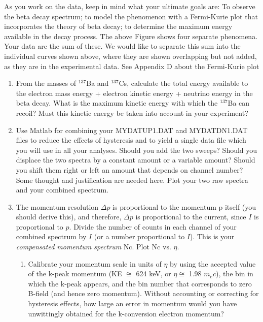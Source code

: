 \documentclass{../lab}
\begin{document}
As you work on the data, keep in mind what your ultimate goals are: To observe the beta decay spectrum; to model the phenomenon with a Fermi-Kurie plot that incorporates the theory of beta decay; to determine the maximum energy available in the decay process. The above Figure shows four separate phenomena. Your data are the sum of these. We would like to separate this sum into the individual curves shown above, where they are shown overlapping but not added, as they are in the experimental data. See Appendix D about the Fermi-Kurie plot

\begin{enumerate}
    \item From the masses of $^{137}$Ba and $^{137}$Cs, calculate the total energy available to the electron mass energy + electron kinetic energy + neutrino energy in the beta decay. What is the maximum kinetic energy with which the $^{137}$Ba can recoil? Must this kinetic energy be taken into account in your experiment?

    \item Use Matlab for combining your MYDATUP1.DAT and MYDATDN1.DAT files to reduce the effects of hysteresis and to yield a single data file which you will use in all your analyses. Should you add the two sweeps? Should you displace the two spectra by a constant amount or a variable amount? Should you shift them right or left an amount that depends on channel number? Some thought and justification are needed here. Plot your two raw spectra and your combined spectrum.

    \item The momentum resolution $\Delta p$ is proportional to the momentum p itself (you should derive this), and therefore, $\Delta p$ is proportional to the current, since $I$ is proportional to $p$. Divide the number of counts in each channel of your combined spectrum by $I$ (or a number proportional to $I$). This is your \emph{compensated momentum spectrum} Nc. Plot Nc vs. $\eta$.

    \begin{enumerate}
        \item Calibrate your momentum scale in units of $\eta$ by using the accepted value of the k-peak momentum (KE $\cong$ 624 keV, or $\eta \cong$ 1.98 $m_e c$), the bin in which the k-peak appears, and the bin number that corresponds to zero B-field (and hence zero momentum). Without accounting or correcting for hysteresis effects, how large an error in momentum would you have unwittingly obtained for the k-conversion electron momentum?


\end{enumerate}
\end{enumerate}
\end{document}
